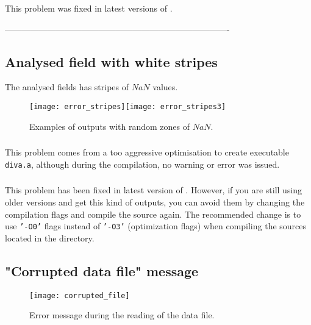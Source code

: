 This problem was fixed in latest versions of \diva. 

-------------------------------------------------------------------------------

\subsection{Analysed field with white stripes}

The analysed fields has stripes of $NaN$ values.

\begin{figure}[htpb]
\centering
\texttt{[image: error\_stripes]}\texttt{[image: error\_stripes3]}
\caption{Examples of \diva outputs with random zones of $NaN$.\label{fig:error_stripes2}}
\end{figure}

\subsubsection{\question}

This problem comes from a too aggressive optimisation to create executable \texttt{diva.a}, although during the compilation, no warning or error was issued.  

\subsubsection{\answer}

This problem has been fixed in latest version of \diva. However, if you are still using older versions and get this kind of outputs, you can avoid them by changing the compilation flags and compile the source again. The recommended change is to use \texttt{'-O0'} flags instead of \texttt{'-O3'} (optimization flags) when compiling the sources located in the  directory.


\subsection{"Corrupted data file" message}


\begin{figure}[htpb]
\centering
\texttt{[image: corrupted\_file]}
\caption{Error message during the reading of the data file.}
\end{figure}

